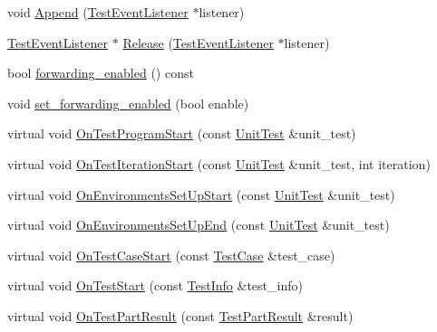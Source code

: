 \begin{DoxyCompactItemize}
\item 
void \hyperlink{classtesting_1_1internal_1_1_test_event_repeater_ad154ce021881721a5c46994316b14cb1}{Append} (\hyperlink{classtesting_1_1_test_event_listener}{Test\-Event\-Listener} $\ast$listener)
\item 
\hyperlink{classtesting_1_1_test_event_listener}{Test\-Event\-Listener} $\ast$ \hyperlink{classtesting_1_1internal_1_1_test_event_repeater_a6aae8ac4eb3d9aa655f2ba71673dfd06}{Release} (\hyperlink{classtesting_1_1_test_event_listener}{Test\-Event\-Listener} $\ast$listener)
\item 
bool \hyperlink{classtesting_1_1internal_1_1_test_event_repeater_a65c4a855a505ff74c843cf50ad56b4c1}{forwarding\-\_\-enabled} () const 
\item 
void \hyperlink{classtesting_1_1internal_1_1_test_event_repeater_a86c52e311b70598a385a0589277e92e0}{set\-\_\-forwarding\-\_\-enabled} (bool enable)
\item 
virtual void \hyperlink{classtesting_1_1internal_1_1_test_event_repeater_a15ee2ff051063088d3a89a266d5ffcc4}{On\-Test\-Program\-Start} (const \hyperlink{classtesting_1_1_unit_test}{Unit\-Test} \&unit\-\_\-test)
\item 
virtual void \hyperlink{classtesting_1_1internal_1_1_test_event_repeater_a287bfe702e3aa2dfd95106592935ba8f}{On\-Test\-Iteration\-Start} (const \hyperlink{classtesting_1_1_unit_test}{Unit\-Test} \&unit\-\_\-test, int iteration)
\item 
virtual void \hyperlink{classtesting_1_1internal_1_1_test_event_repeater_ae71819925adec0471fa7abc5072b8244}{On\-Environments\-Set\-Up\-Start} (const \hyperlink{classtesting_1_1_unit_test}{Unit\-Test} \&unit\-\_\-test)
\item 
virtual void \hyperlink{classtesting_1_1internal_1_1_test_event_repeater_a3a92696df942dc92f985e52fddd6d303}{On\-Environments\-Set\-Up\-End} (const \hyperlink{classtesting_1_1_unit_test}{Unit\-Test} \&unit\-\_\-test)
\item 
virtual void \hyperlink{classtesting_1_1internal_1_1_test_event_repeater_a70124c738caa338bcd723eb2a51c8b3e}{On\-Test\-Case\-Start} (const \hyperlink{classtesting_1_1_test_case}{Test\-Case} \&test\-\_\-case)
\item 
virtual void \hyperlink{classtesting_1_1internal_1_1_test_event_repeater_a70d694ca5010cc86cd458f7f529e6fbe}{On\-Test\-Start} (const \hyperlink{classtesting_1_1_test_info}{Test\-Info} \&test\-\_\-info)
\item 
virtual void \hyperlink{classtesting_1_1internal_1_1_test_event_repeater_ac8fb21da6802b1ebab9cad3eee9150eb}{On\-Test\-Part\-Result} (const \hyperlink{classtesting_1_1_test_part_result}{Test\-Part\-Result} \&result)

\end{DoxyCompactItemize}
